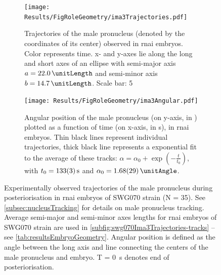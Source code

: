 \begin{figure}
\centering
\begin{subfigure}[t]{0.4\textwidth}
    \centering
    \texttt{[image: Results/FigRoleGeometry/ima3Trajectories.pdf]}
    \caption{Trajectories of the male pronucleus (denoted by the coordinates of its center) observed in  \ac{rnai} embryos. Color represents time. x- and y-axes lie along the long and short axes of an ellipse with semi-major axis $a = \SI{22.0}{\unitLength}$ and semi-minor axis $b = \SI{14.7}{\unitLength}$. Scale bar: \SI{5}{\unitLength}} 
    \label{subfig:swg070Ima3Trajectories-tracks}
\end{subfigure}
\hfill
\begin{subfigure}[t]{0.57\textwidth}
    \centering
    \texttt{[image: Results/FigRoleGeometry/ima3Angular.pdf]}
    \caption{Angular position of the male pronucleus (on y-axis, in \si{\unitAngle}) plotted as a function of time (on x-axis, in \si{\second}), in  \ac{rnai} embryos. Thin black lines represent individual trajectories, thick black line represents a exponential fit to the average of these tracks: $\alpha = \alpha_0 + \exp(-\frac{t}{t_0})$, with $t_0 = \SI{133 +- 3}{\second}$ and $\alpha_0 = \SI{1.68 +- 0.29}{\unitAngle}$.} 
    \label{subfig:swg070Ima3Trajectories-angleVsTime}
\end{subfigure}
\caption[Experimentally observed trajectories of the male pronucleus in  \acs{rnai} embryos]{Experimentally observed trajectories of the male pronucleus during posteriorisation in  \ac{rnai} embryos of SWG070 strain (N = 35). See \autoref{subsec:nucleusTracking} for details on male pronucleus tracking. Average semi-major and semi-minor axes lengths for  \ac{rnai} embryos of SWG070 strain are used in \autoref{subfig:swg070Ima3Trajectories-tracks} -- see \autoref{tab:resultsEmbryoGeometry}. Angular position is defined as the angle between the long axis and line connecting the centers of the male pronucleus and embryo. T = \SI{0}{\second} denotes end of posteriorisation.}
\label{fig:swg070Ima3Trajectories}
\end{figure}

